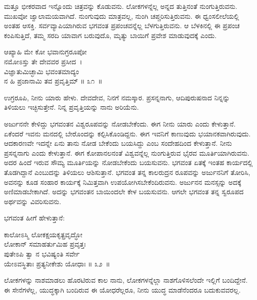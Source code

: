 ಮತ್ತೂ ಭೀಕರವಾದ ಇನ್ನೊಂದು ಚಿತ್ರವನ್ನು ಕೊಡುವನು. ಲೋಕಗಳನ್ನೆಲ್ಲ ಅನ್ನದ ತುತ್ತಿನಂತೆ ನುಂಗುತ್ತಿರುವನು. ಮುಖವೋ ಜ್ವಾಲಾಮಯವಾಗಿದೆ. ನುಂಗುವುದು ಮಾತ್ರವಲ್ಲ, ನುಂಗಿ ಚಪ್ಚರಿಸುತ್ತಿರುವನು. ಈ ಧ್ವಂಸಲೀಲೆಯಲ್ಲಿ ಅಂತಹ ಆಸಕ್ತಿ. ಸರ್ವವ್ಯಾಪಿಯಾಗಿರುವ ಭಗವಂತ ಪ್ರಪಂಚವನ್ನೆಲ್ಲ ಬೆಳಗುತ್ತಿರುವನು. ಆ ಬೆಳಕಿನಲ್ಲಿ ಈ ಪ್ರಪಂಚ ಕಂಪಿಸುತ್ತಿದೆ, ತಮ್ಮ ಸರದಿ ಯಾವಾಗ ಬರುವುದೊ, ಮೃತ್ಯು ಬಾಯಿಗೆ ಪ್ರವೇಶ ಮಾಡುವುದಕ್ಕೆ ಎಂದು. 

\begin{shloka}
ಆಖ್ಯಾಹಿ ಮೇ ಕೋ ಭವಾನುಗ್ರರೂಪೋ \\ ನಮೋಽಸ್ತು ತೇ ದೇವವರ ಪ್ರಸೀದ~।\\ವಿಜ್ಞಾತುಮಿಚ್ಛಾಮಿ ಭವಂತಮಾದ್ಯಂ \\ ನ ಹಿ ಪ್ರಜಾನಾಮಿ ತವ ಪ್ರವೃತ್ತಿಮ್ \hfill॥ ೩೧~॥
\end{shloka}

\begin{artha}
ಉಗ್ರರೂಪಿ, ನೀನು ಯಾರು ಹೇಳು. ದೇವದೇವ, ನಿನಗೆ ನಮಸ್ಕಾರ. ಪ್ರಸನ್ನನಾಗು, ಆದಿಪುರುಷನಾದ ನಿನ್ನನ್ನು ತಿಳಿಯಲು ಇಚ್ಛಿಸುತ್ತೇನೆ. ನಿನ್ನ ಪ್ರವೃತ್ತಿಯನ್ನು ನಾನು ಅರಿಯೆನು.
\end{artha}

\newpage

ಅರ್ಜುನನೇ ಕೇಳಿದ್ದು ಭಗವಂತನ ವಿಶ್ವರೂಪವನ್ನು ನೋಡಬೇಕೆಂದು. ಈಗ ನೀನು ಯಾರು ಎಂದು ಕೇಳುತ್ತಾನೆ. ಏಕೆಂದರೆ ಇವನು ಮನದಲ್ಲಿ ಬೇರೊಂದನ್ನು ಕಲ್ಪಿಸಿಕೊಂಡಿದ್ದನು. ಈಗ ಇವನಿಗೆ ಕಾಣುವುದು ಭಯಾನಕವಾಗಿರುವುದು. ಆದಕಾರಣವೇ ಇದನ್ನೇ ಏನು ತಾನು ನೋಡ ಬೇಕೆಂದು ಬಯಸಿದ್ದು ಎಂಬ ಸಂದೇಹದಿಂದ ಕೇಳುತ್ತಾನೆ. ನೀನು ಪ್ರಸನ್ನನಾಗು ಎಂದು ಕೇಳುತ್ತಾನೆ. ಈಗ ಕೋಪಾನಲನಂತೆ ವಿಶ್ವವನ್ನೆಲ್ಲ ನುಂಗುತ್ತಿರುವ ಭೈರವ ಮೂರ್ತಿಯಾಗಿರುವನು. ಅದರ ಹಿಂದೆ ಇರುವ ಸೌಮ್ಯ ಮೂರ್ತಿಯನ್ನು ನೋಡಬೇಕೆಂದು ಬಯಸುವನು. ಭಗವಂತ ಏತಕ್ಕೆ ಇಂತಹ ಕಾರ್ಯದಲ್ಲಿ ತೊಡಗಿದ್ದಾನೆ ಎಂಬುದನ್ನು ತಿಳಿಯಲು ಆಶಿಸುತ್ತಾನೆ. ಭಗವಂತ ತನ್ನ ಕಾಲರುದ್ರನ ರೂಪವನ್ನು ಅರ್ಜುನನಿಗೆ ತೋರಿಸಿ, ಅವನನ್ನು ಕೂಡ ಸಂಹಾರ ಕಾರ್ಯಕ್ಕೆ ನಿಮಿತ್ತವಾಗಿ ಉಪಯೋಗಿಸಬೇಕೆಂದಿರುವನು. ಅರ್ಜುನನ ಮನಸ್ಸನ್ನು ಅದಕ್ಕೆ ಅಣಿಮಾಡಬೇಕಾಗಿದೆ. ಅದನ್ನು ಭಗವಂತನ ಬಾಯಿಂದಲೇ ಕೇಳ ಬಯಸುವನು. ಆಗಲೇ ಭಗವಂತ ತನ್ನ ಸ್ವರೂಪದ ಅರ್ಥವನ್ನು ವಿವರಿಸುವನು.

ಭಗವಂತ ಹೀಗೆ ಹೇಳುತ್ತಾನೆ:

\begin{shloka}
ಕಾಲೋಽಸ್ಮಿ ಲೋಕಕ್ಷಯಕೃತ್ಪ್ರವೃದ್ಧೋ \\ ಲೋಕಾನ್ ಸಮಾಹರ್ತುಮಿಹ ಪ್ರವೃತ್ತಃ\\ಪುತೇಽಪಿ ತ್ವಾ ನ ಭವಿಷ್ಯಂತಿ ಸರ್ವೇ \\ ಯೇಽವಸ್ಥಿತಾಃ ಪ್ರತ್ಯನೀಕೇಶು ಯೋಧಾಃ \hfill॥ ೩೨~॥
\end{shloka}

\begin{artha}
 ಲೋಕಗಳನ್ನು ನಾಶಮಾಡಲು ಹೊರಟಿರುವ ಕಾಲ ನಾನು, ಲೋಕಗಳನ್ನೆಲ್ಲಾ ನಾಶಗೊಳಿಸಲೆಂದೇ ಇಲ್ಲಿಗೆ ಬಂದಿದ್ದೇನೆ. ಈ ಸೇನೆಗಳೆಲ್ಲ, ಯುದ್ಧಕ್ಕಾಗಿ ಬಂದಿರುವ ಈ ಯೋಧರೆಲ್ಲರೂ, ನೀನು ಯುದ್ಧ ಮಾಡೆನೆಂದರೂ ಬದುಕುವವರಲ್ಲ. 
\end{artha}

